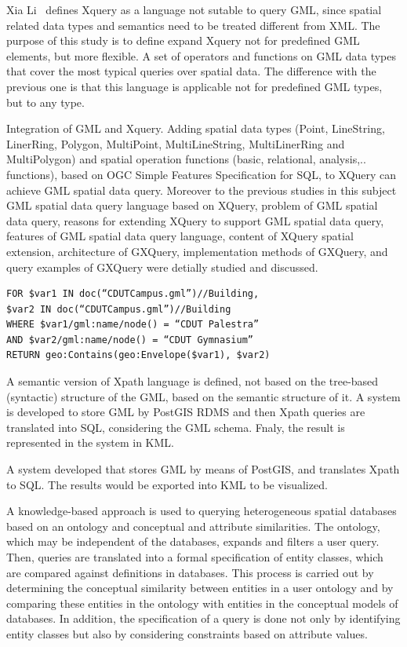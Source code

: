 \documentclass[a4paper,12pt]{article}
\begin{document}
Xia Li~\cite{Lisa2006} defines Xquery as a language  not sutable to query GML, 
since spatial related data types and semantics need to be treated different from XML. 
The purpose of this study is to define expand Xquery not for predefined GML elements, 
but more flexible.  A set of operators and functions on GML data types that cover 
the most typical queries over spatial data. The difference with the previous one is 
that this language is applicable not for predefined GML types, but to any type.

\cite{Chen2010} Integration of GML and Xquery. Adding spatial data types 
(Point, LineString, LinerRing, Polygon, MultiPoint, MultiLineString, MultiLinerRing 
and MultiPolygon) and spatial operation functions (basic, relational, analysis,.. functions), 
based on OGC Simple Features Specification for SQL, to XQuery can achieve GML spatial data query. 
Moreover to the previous studies in this subject GML spatial data query language 
based on XQuery, problem of GML spatial data query, reasons for extending XQuery to
support GML spatial data query, features of GML spatial data query language, 
content of XQuery spatial extension, architecture of GXQuery, implementation methods 
of GXQuery, and query examples of GXQuery were detially studied and discussed. 

\begin{verbatim}
FOR $var1 IN doc(“CDUTCampus.gml”)//Building,
$var2 IN doc(“CDUTCampus.gml”)//Building
WHERE $var1/gml:name/node() = “CDUT Palestra”
AND $var2/gml:name/node() = “CDUT Gymnasium”
RETURN geo:Contains(geo:Envelope($var1), $var2)
\end{verbatim}

\cite{Alemdros2013} A semantic version of Xpath language is defined, not based on the tree-based (syntactic) structure of the GML, based on the semantic structure of it.
A system is developed to store GML by PostGIS RDMS and then Xpath queries are translated into SQL, considering the GML schema. Fnaly, the result is represented in the system in KML.

\cite{Alemdros2011} A system developed that stores GML by means of PostGIS, and translates Xpath to SQL.
The results would be exported into KML to be visualized.

\cite{Gutierrez2004} A knowledge-based approach is used to querying heterogeneous spatial databases based on an ontology and conceptual and attribute similarities. The ontology, which may be independent of the databases, expands and filters a user query. Then, queries are translated into a formal specification of entity classes, which are compared against definitions in databases. This process is carried out by determining the conceptual similarity between entities in a user ontology and by comparing these entities in the ontology with entities in the conceptual models of databases. In addition, the speciﬁcation of a query is done not only by identifying entity classes but also by considering constraints based on attribute values.
\end{document}
